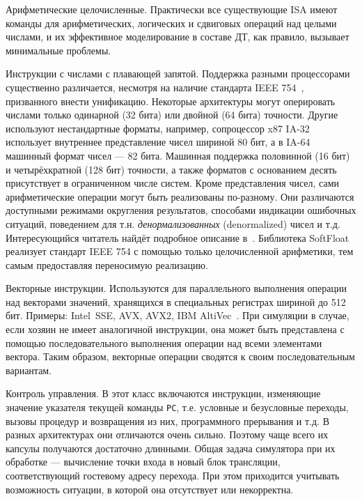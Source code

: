 \begin{description*}
    \item[Арифметические целочисленные.] Практически все существующие ISA имеют команды для арифметических, логических и сдвиговых операций над целыми числами, и их эффективное моделирование в составе ДТ, как правило, вызывает минимальные проблемы.
    
    \item[Инструкции с числами с плавающей запятой.] Поддержка разными процессорами существенно различается, несмотря на наличие стандарта IEEE 754~\cite{ieee754}, призванного внести унификацию. Некоторые архитектуры могут оперировать числами только одинарной (32 бита) или двойной (64 бита) точности. Другие используют нестандартные форматы, например, сопроцессор x87 IA-32 использует внутреннее представление чисел шириной 80 бит, а в IA-64 машинный формат чисел --- 82 бита. Машинная поддержка половинной (16 бит) и четырёхкратной (128 бит) точности, а также форматов с основанием десять присутствует в ограниченном числе систем.
    Кроме представления чисел, сами арифметические операции могут быть реализованы по-разному. Они различаются доступными режимами округления результатов, способами индикации ошибочных ситуаций, поведением для т.н. \textit{денормализованных} (\abbr denormalized) чисел и т.д. Интересующийся читатель найдёт подробное описание в~\cite{MullerEtAl2010}. Библиотека SoftFloat~\cite{softfloat} реализует стандарт IEEE 754 с помощью только целочисленной арифметики, тем самым предоставляя переносимую реализацию.
    
    \item[Векторные инструкции.] Используются для параллельного выполнения операции над векторами значений, хранящихся в специальных регистрах шириной до 512 бит. Примеры: Intel\textregistered~SSE, AVX, AVX2, IBM AltiVec~\cite{altivec}. При симуляции в случае, если хозяин не имеет аналогичной инструкции, она может быть представлена с помощью последовательного выполнения операции над всеми элементами вектора. Таким образом, векторные операции сводятся к своим последовательным вариантам.
    
    \item[Контроль управления.] В этот класс включаются инструкции, изменяющие значение указателя текущей команды \texttt{PC}, т.е. условные и безусловные переходы, вызовы процедур и возвращения из них, программного прерывания и т.д. В разных архитектурах они отличаются очень сильно. Поэтому чаще всего их капсулы получаются достаточно длинными. Общая задача симулятора при их обработке --- вычисление точки входа в новый блок трансляции, соответствующий гостевому адресу перехода. При этом приходится учитывать возможность ситуации, в которой она отсутствует или некорректна. %
    

\end{description*}
